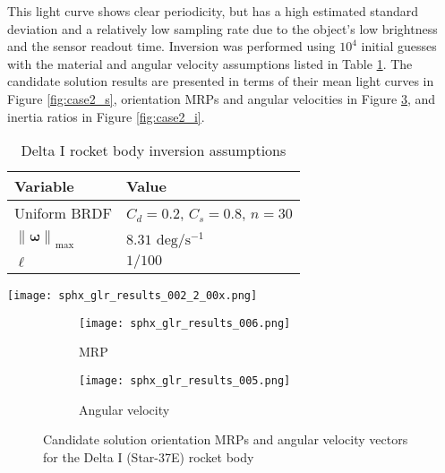 \documentclass[a4paper,twocolumn]{spaceDebrisC} %
\newcommand{\vctr}[1]{\bm{#1}}
\newcommand{\norm}[1]{\left\lVert#1\right\rVert}
\newcommand{\figmed}[0]{0.4\textwidth}
\begin{document}
This light curve shows clear periodicity, but has a high estimated standard deviation and a relatively low sampling rate due to the object's low brightness and the sensor readout time. Inversion was performed using $10^4$ initial guesses with the material and angular velocity assumptions listed in Table \ref{tb:case2_ass}. The candidate solution results are presented in terms of their mean light curves in Figure \ref{fig:case2_s}, orientation MRPs and angular velocities in Figure \ref{fig:case2_pw}, and inertia ratios in Figure \ref{fig:case2_i}.

\begin{table}[H]
  \centering
  \caption{Delta I rocket body inversion assumptions}
  \vspace*{6pt}
  \begin{tabular}{|l|l|}
  \hline
  \textbf{Variable} & \textbf{Value} \\ \hline
 Uniform BRDF & $C_d=0.2$, $C_s=0.8$, $n=30$ \\ \hline
 $\norm{\vctr{\omega}}_\text{max}$ & $8.31$ $\text{deg} / \text{s}^{-1}$ \\ \hline
 $\ell$ & $1/100$ \\ \hline
\end{tabular}
  \label{tb:case2_ass}
\end{table}

\begin{figure*}[t]
  \centering
  \texttt{[image: sphx\_glr\_results\_002\_2\_00x.png]}
  \caption{Candidate solution light curves compared to the real measurements in ADU for the Delta I (Star-37E) rocket body.}
  \label{fig:case2_s}
\end{figure*}


\begin{figure}[H]
  \centering
  \begin{subfigure}[t]{0.23\textwidth}
    \centering
    \texttt{[image: sphx\_glr\_results\_006.png]}
    \caption{MRP}
    \label{fig:case2_pwa}
  \end{subfigure}
  \hfill
  \begin{subfigure}[t]{0.23\textwidth}
    \centering
    \texttt{[image: sphx\_glr\_results\_005.png]}
    \caption{Angular velocity}
    \label{fig:case2_pwb}
  \end{subfigure}

  \caption{Candidate solution orientation MRPs and angular velocity vectors for the Delta I (Star-37E) rocket body}
  \label{fig:case2_pw}
\end{figure}
\end{document}

